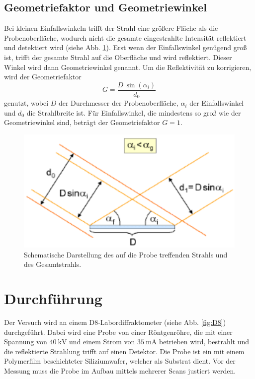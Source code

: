 \subsection{Geometriefaktor und Geometriewinkel}
Bei kleinen Einfallswinkeln trifft der Strahl eine größere Fläche als die Probenoberfläche, wodurch nicht die gesamte eingestrahlte Intensität reflektiert und detektiert wird (siehe Abb. \ref{fig:Geometriewinkel}).
Erst wenn der Einfallswinkel genügend groß ist, trifft der gesamte Strahl auf die Oberfläche und wird reflektiert. Dieser Winkel wird dann Geometriewinkel genannt.
Um die Reflektivität zu korrigieren, wird der Geometriefaktor
\begin{equation}
    G = \frac{D \, \sin(\alpha_i)}{d_0}
    \label{eq:Geometriefaktor}
\end{equation}
genutzt, wobei $D$ der Durchmesser der Probenoberfläche, $\alpha_i$ der Einfallswinkel und $d_0$ die Strahlbreite ist.
Für Einfallswinkel, die mindestens so groß wie der Geometriewinkel sind, beträgt der Geometriefaktor $G = 1$. 

\begin{figure}
    \centering
    \includegraphics[width=0.7\linewidth]{./figures/Geometriewinkel.png}
    \caption{Schematische Darstellung des auf die Probe treffenden Strahls und des Gesamtstrahls. \cite{V44old}}
    \label{fig:Geometriewinkel}
\end{figure}


\section{Durchführung}
\label{sec:durchfuehrung}
Der Versuch wird an einem D8-Labordiffraktometer (siehe Abb. \ref{fig:D8}) durchgeführt.
Dabei wird eine Probe von einer Röntgenröhre, die mit einer Spannung von $\SI{40}{\kilo\volt}$ und einem Strom von $\SI{35}{\milli\ampere}$ betrieben wird, bestrahlt und die reflektierte Strahlung trifft auf einen Detektor. %
Die Probe ist ein mit einem Polymerfilm beschichteter Siliziumwafer, welcher als Substrat dient.
Vor der Messung muss die Probe im Aufbau mittels mehrerer Scans justiert werden.

